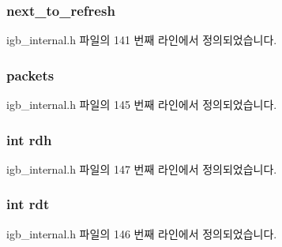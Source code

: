 \subsubsection[{\texorpdfstring{next\+\_\+to\+\_\+refresh}{next_to_refresh}}]{ next\+\_\+to\+\_\+refresh}\hypertarget{structrx__ring_aab3e5ae9f841cbc34fddab6abd9ed519}{}\label{structrx__ring_aab3e5ae9f841cbc34fddab6abd9ed519}


igb\+\_\+internal.\+h 파일의 141 번째 라인에서 정의되었습니다.

\subsubsection[{\texorpdfstring{packets}{packets}}]{ packets}\hypertarget{structrx__ring_a5ff69346aaa72fb9bf0c095156ddccbb}{}\label{structrx__ring_a5ff69346aaa72fb9bf0c095156ddccbb}


igb\+\_\+internal.\+h 파일의 145 번째 라인에서 정의되었습니다.

\subsubsection[{\texorpdfstring{rdh}{rdh}}]{\setlength{\rightskip}{0pt plus 5cm}int rdh}\hypertarget{structrx__ring_a8bdeae62f96fbc60ee3fa9aefb4aa66a}{}\label{structrx__ring_a8bdeae62f96fbc60ee3fa9aefb4aa66a}


igb\+\_\+internal.\+h 파일의 147 번째 라인에서 정의되었습니다.

\subsubsection[{\texorpdfstring{rdt}{rdt}}]{\setlength{\rightskip}{0pt plus 5cm}int rdt}\hypertarget{structrx__ring_a3742516ecd0d67208a44cd784dc18e9d}{}\label{structrx__ring_a3742516ecd0d67208a44cd784dc18e9d}


igb\+\_\+internal.\+h 파일의 146 번째 라인에서 정의되었습니다.

